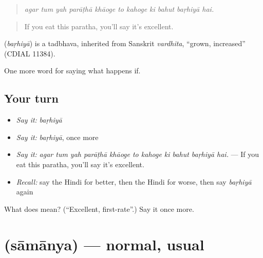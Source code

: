 \begin{quote}
          
\end{quote}

\begin{quote}
\emph{agar tum yah parāṭhā khāoge to kahoge ki bahut baṛhiyā hai.}
\end{quote}

\begin{quote}
If you eat this paratha, you'll say it's excellent.
\end{quote}

\begin{cousinweb}
\textbf{} (\emph{baṛhiyā}) is a tadbhava, inherited from Sanskrit \emph{vardhita}, \textquotedblleft{}grown, increased\textquotedblright{} (CDIAL 11384).
\end{cousinweb}

\begin{grammarlens}[title={What you've built}]
One more word for saying what happens if.
\end{grammarlens}

\subsection*{Your turn}
\begin{itemize}
\raggedright
  \item \emph{Say it:} \emph{baṛhiyā}
  \item \emph{Say it:} \emph{baṛhiyā}, once more
  \item \emph{Say it:} \emph{agar tum yah parāṭhā khāoge to kahoge ki bahut baṛhiyā hai.} — If you eat this paratha, you'll say it's excellent.
  \item \emph{Recall:} say the Hindi for better, then the Hindi for worse, then say \emph{baṛhiyā} again
\end{itemize}

\begin{tcolorbox}[breakable,colback=teal!4,colframe=teal!35!black,title={Before you move on}]
What does  mean? (\textquotedblleft{}Excellent, first-rate\textquotedblright{}.) Say it once more.
\end{tcolorbox}
\section[\texorpdfstring{\hi{सामान्य} (sāmānya)}{सामान्य (sāmānya)}]{ (sāmānya) — normal, usual}

